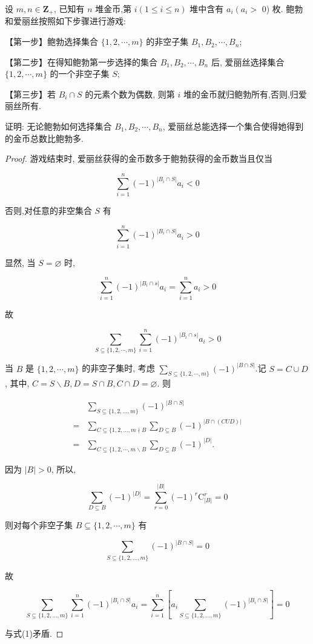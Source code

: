 \begin{example}
设 $m, n \in \mathbf{Z}_{+}$, 已知有 $n$ 堆金币,第 $i(1 \leqslant i \leqslant n)$ 堆中含有 $a_{i}\left(a_{i}>\right.$ 0) 枚. 鲍勃和爱丽丝按照如下步骤进行游戏:

【第一步】鲍勃选择集合 $\{1,2, \cdots, m\}$ 的非空子集 $B_{1}, B_{2}, \cdots, B_{n}$;

【第二步】在得知鲍勃第一步选择的集合 $B_{1}, B_{2}, \cdots, B_{n}$ 后, 爱丽丝选择集合 $\{1,2, \cdots, m\}$ 的一个非空子集 $S ;$

【第三步】若 $B_{i} \cap S$ 的元素个数为偶数, 则第 $i$ 堆的金币就归鲍勃所有,否则,归爱丽丝所有.

证明: 无论鲍勃如何选择集合 $B_{1}, B_{2}, \cdots, B_{n}$, 爱丽丝总能选择一个集合使得她得到的金币总数比鲍勃多.
\end{example}

\begin{proof}
游戏结束时, 爱丽丝获得的金币数多于鲍勃获得的金币数当且仅当

$$
\sum_{i=1}^{n}(-1)^{\left|B_{i} \cap S\right|} a_{i}<0
$$

否则,对任意的非空集合 $S$ 有

$$
\sum_{i=1}^{n}(-1)^{\left|B_{i} \cap S\right|} a_{i}>0
$$

显然, 当 $S=\varnothing$ 时,

$$
\sum_{i=1}^{n}(-1)^{\left|B_{i} \cap s\right|} a_{i}=\sum_{i=1}^{n} a_{i}>0
$$

故


\begin{equation*}
\sum_{S \subseteq\{1,2, \cdots, m\}} \sum_{i=1}^{n}(-1)^{\left|B_{i} \cap s\right|} a_{i}>0 \tag{1}
\end{equation*}


当 $B$ 是 $\{1,2, \cdots, m\}$ 的非空子集时, 考虑 $\sum_{S \subseteq\{1,2, \cdots, m\}}(-1)^{|B \cap S|}$.记 $S=C \cup D$, 其中, $C=S \backslash B, D=S \cap B, C \cap D=\varnothing$. 则

$$
\begin{aligned}
& \sum_{S \subseteq\{1,2, \ldots, m\}}(-1)^{|B \cap S|} \\
= & \sum_{C \subseteq\{1,2, \ldots, m \nmid B} \sum_{D \subseteq B}(-1)^{|B \cap(C U D)|} \\
= & \sum_{C \subseteq\{1,2, \cdots, m \backslash B} \sum_{D \subseteq B}(-1)^{|D|} .
\end{aligned}
$$

因为 $|B|>0$, 所以,

$$
\sum_{D \subseteq B}(-1)^{|D|}=\sum_{r=0}^{|B|}(-1)^{r} \mathrm{C}_{|B|}^{r}=0
$$

则对每个非空子集 $B \subseteq\{1,2, \cdots, m\}$ 有

$$
\sum_{S \subseteq\{1,2, \ldots, m\}}(-1)^{|B \cap S|}=0
$$

故

$$
\sum_{S \subseteq\{1,2, \ldots, m\}} \sum_{i=1}^{n}(-1)^{\left|B_{i} \cap S\right|} a_{i}=\sum_{i=1}^{n}\left[a_{i} \sum_{S \subseteq\{1,2, \ldots, m\}}(-1)^{\left|B_{i} \cap S\right|}\right]=0
$$

与式(1)矛盾.
\end{proof}

